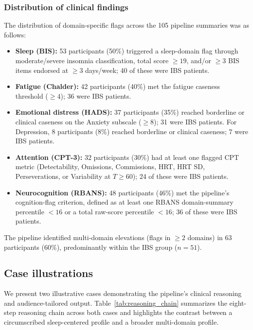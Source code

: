 \documentclass[11pt,a4paper]{article}
\begin{document}
\subsubsection{Distribution of clinical findings}

The distribution of domain-specific flags across the 105 pipeline summaries was as follows:

\begin{itemize}[leftmargin=*]
    \item \textbf{Sleep (BIS):} 53 participants (50\%) triggered a sleep-domain flag through moderate/severe insomnia classification, total score $\geq 19$, and/or $\geq 3$ BIS items endorsed at $\geq 3$ days/week; 40 of these were IBS patients.
    \item \textbf{Fatigue (Chalder):} 42 participants (40\%) met the fatigue caseness threshold ($\geq 4$); 36 were IBS patients.
    \item \textbf{Emotional distress (HADS):} 37 participants (35\%) reached borderline or clinical caseness on the Anxiety subscale ($\geq 8$); 31 were IBS patients. For Depression, 8 participants (8\%) reached borderline or clinical caseness; 7 were IBS patients.
    \item \textbf{Attention (CPT-3):} 32 participants (30\%) had at least one flagged CPT metric (Detectability, Omissions, Commissions, HRT, HRT SD, Perseverations, or Variability at $T \geq 60$); 24 of these were IBS patients.
    \item \textbf{Neurocognition (RBANS):} 48 participants (46\%) met the pipeline's cognition-flag criterion, defined as at least one RBANS domain-summary percentile $< 16$ or a total raw-score percentile $< 16$; 36 of these were IBS patients.
\end{itemize}

The pipeline identified multi-domain elevations (flags in $\geq 2$ domains) in 63 participants (60\%), predominantly within the IBS group ($n = 51$).


\subsection{Case illustrations}

We present two illustrative cases demonstrating the pipeline's clinical reasoning and audience-tailored output. Table~\ref{tab:reasoning_chain} summarizes the eight-step reasoning chain across both cases and highlights the contrast between a circumscribed sleep-centered profile and a broader multi-domain profile.
\end{document}
